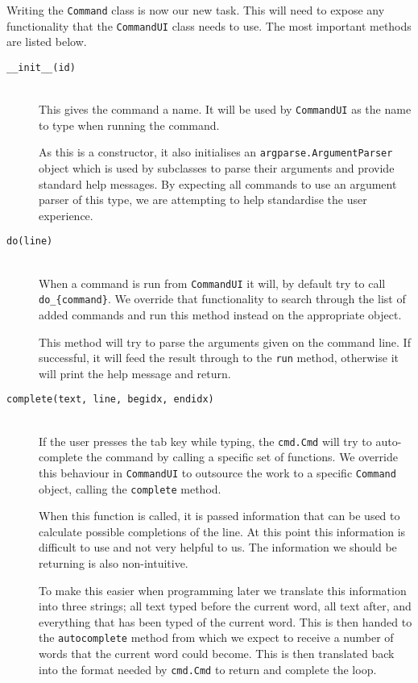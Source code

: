 \documentclass[twoside,a4paper]{report}
\begin{document}
Writing the \texttt{Command} class is now our new task. This will need to expose any functionality that the \texttt{CommandUI} class needs to use. The
most important methods are listed below.

\begin{description}
\item[\texttt{\_\_init\_\_(id)}] \hfill \\
This gives the command a name. It will be used by \texttt{CommandUI} as the name to type when running the command.

As this is a constructor, it also initialises an \texttt{argparse.ArgumentParser} object which is used by subclasses to parse their arguments and
provide standard help messages. By expecting all commands to use an argument parser of this type, we are attempting to help standardise the user
experience.

\item[\texttt{do(line)}] \hfill \\
When a command is run from \texttt{CommandUI} it will, by default try to call \texttt{do\_\{command\}}. We override that functionality to search
through the list of added commands and run this method instead on the appropriate object.

This method will try to parse the arguments given on the command line. If successful, it will feed the result through to the \texttt{run} method,
otherwise it will print the help message and return.

\item[\texttt{complete(text, line, begidx, endidx)}] \hfill \\
If the user presses the tab key while typing, the \texttt{cmd.Cmd} will try to auto-complete the command by calling a specific set of functions. We
override this behaviour in \texttt{CommandUI} to outsource the work to a specific \texttt{Command} object, calling the \texttt{complete} method.

When this function is called, it is passed information that can be used to calculate possible completions of the line. At this point this information
is difficult to use and not very helpful to us. The information we should be returning is also non-intuitive.

To make this easier when programming later we translate this information into three strings; all text typed before the current word, all text after,
and everything that has been typed of the current word. This is then handed to the \texttt{autocomplete} method from which we
expect to receive a number of words that the current word could become. This is then translated back into the format needed by \texttt{cmd.Cmd} to
return and complete the loop.


\end{description}
\end{document}
